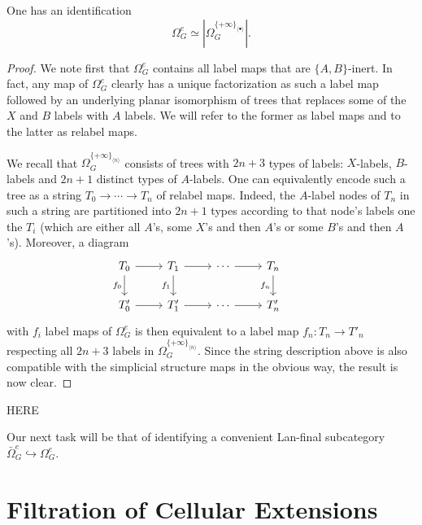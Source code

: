 \documentclass[a4paper,10pt]{article}%
\begin{document}
\begin{proposition}
One has an identification
\[
\Omega_G^e \simeq 
|\Omega_{G}^{\{+\infty\}_{\langle \bullet \rangle}}|.
\]
\end{proposition}


\begin{proof}
We note first that $\Omega_{G}^e$ contains all label maps that are $\{A,B\}$-inert. In fact, any map of $\Omega_{G}^e$ clearly has a unique factorization as such a label map followed by an underlying planar isomorphism of trees that replaces some of the $X$ and $B$ labels with $A$ labels.
We will refer to the former as label maps and to the latter as relabel maps.

We recall that 
$\Omega_{G}^{\{+\infty\}_{\langle n \rangle}}$
consists of trees with $2n+3$ types of labels: 
$X$-labels, $B$-labels and $2n+1$ distinct types of $A$-labels.
One can equivalently encode such a tree as a string 
$T_0 \to \cdots \to T_n$
of relabel maps. Indeed, the $A$-label nodes of $T_n$ in such a string are partitioned into $2n+1$ types according to that node's labels one the $T_i$ (which are either all $A$'s, some $X$'s and then $A$'s or some $B$'s and then $A$'s).
Moreover, a diagram
\[
\begin{tikzcd}
	T_0 \ar{r} \ar{d}[swap]{f_0} & 
	T_1 \ar{r} \ar{d}[swap]{f_1} & 
	\cdots \ar{r} &
	T_n \ar{d}[swap]{f_n} &
\\
	T'_0 \ar{r} &
	T'_1 \ar{r} &
	\cdots \ar{r} &
	T'_n 
\end{tikzcd}
\]
with $f_i$ label maps of $\Omega^{e}_G$ is then equivalent to a label map $f_n \colon T_n \to T'_n$ respecting all $2n+3$ labels 
in $\Omega_{G}^{\{+\infty\}_{\langle n \rangle}}$.
Since the string description above is also compatible with the simplicial structure maps in the obvious way, 
the result is now clear. 
\end{proof}


{\color{red} HERE}


Our next task will be that of identifying a convenient Lan-final subcategory $\bar{\Omega}_G^{e} \hookrightarrow \Omega_G^e$.





\newpage



\section{Filtration of Cellular Extensions}
\end{document}
